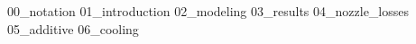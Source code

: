 {00_notation}
\pagebreak
{}
{01_introduction}
{02_modeling}
{03_results}
{04_nozzle_losses}
{05_additive}
{06_cooling}